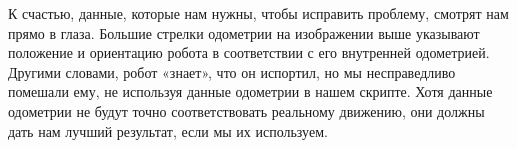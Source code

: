 К счастью, данные, которые нам нужны, чтобы исправить проблему, смотрят нам прямо в глаза. Большие стрелки одометрии на изображении выше указывают положение и ориентацию робота в соответствии с его внутренней одометрией. Другими словами, робот «знает», что он испортил, но мы несправедливо помешали ему, не используя данные одометрии в нашем скрипте. Хотя данные одометрии не будут точно соответствовать реальному движению, они должны дать нам лучший результат, если мы их используем.


